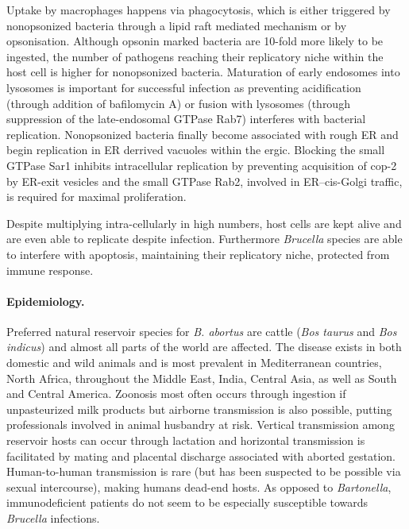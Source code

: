 
Uptake by macrophages happens via phagocytosis, which is either triggered by nonopsonized bacteria through a lipid raft mediated mechanism or by opsonisation. Although opsonin marked bacteria are 10-fold more likely to be ingested, the number of pathogens reaching their replicatory niche within the host cell is higher for nonopsonized bacteria. Maturation of early endosomes into lysosomes is important for successful infection as preventing acidification (through addition of bafilomycin A) or fusion with lysosomes (through suppression of the late-endosomal GTPase Rab7) interferes with bacterial replication. Nonopsonized bacteria finally become associated with rough ER and begin replication in ER derrived vacuoles within the \gls{ergic}. Blocking the small GTPase Sar1 inhibits intracellular replication by preventing acquisition of \gls{cop-2} by ER-exit vesicles and the small GTPase Rab2, involved in ER--cis-Golgi traffic, is required for maximal proliferation.

Despite multiplying intra-cellularly in high numbers, host cells are kept alive and are even able to replicate despite infection. Furthermore \textit{Brucella} species are able to interfere with apoptosis, maintaining their replicatory niche, protected from immune response.

\paragraph{Epidemiology.}
Preferred natural reservoir species for \textit{B. abortus} are cattle (\textit{Bos taurus} and \textit{Bos indicus}) and almost all parts of the world are affected. The disease exists in both domestic and wild animals and is most prevalent in Mediterranean countries, North Africa, throughout the Middle East, India, Central Asia, as well as South and Central America. Zoonosis most often occurs through ingestion if unpasteurized milk products but airborne transmission is also possible, putting professionals involved in animal husbandry at risk. Vertical transmission among reservoir hosts can occur through lactation and horizontal transmission is facilitated by mating and placental discharge associated with aborted gestation. Human-to-human transmission is rare (but has been suspected to be possible via sexual intercourse), making humans dead-end hosts. As opposed to \textit{Bartonella}, immunodeficient patients do not seem to be especially susceptible towards \textit{Brucella} infections.

